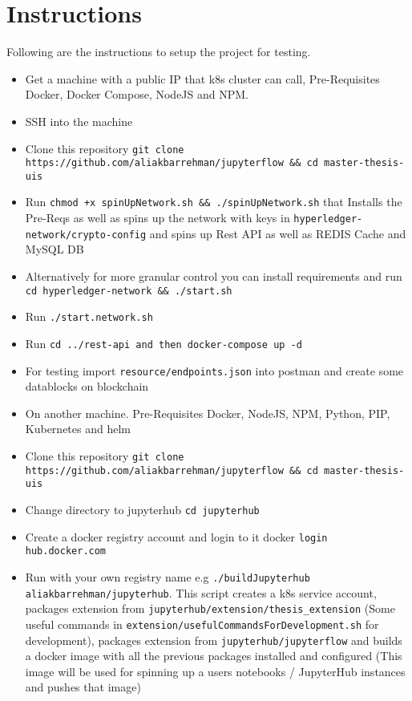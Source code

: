 \section{Instructions}
Following are the instructions to setup the project for testing.
\begin{itemize}
    \item Get a machine with a public IP that k8s cluster can call, Pre-Requisites Docker, Docker Compose, NodeJS and NPM.
    \item SSH into the machine
    \item Clone this repository \lstinline{git clone https://github.com/aliakbarrehman/jupyterflow && cd master-thesis-uis}
    \item Run \lstinline{chmod +x spinUpNetwork.sh && ./spinUpNetwork.sh} that Installs the Pre-Reqs as well as spins up the network with keys in \lstinline{hyperledger-network/crypto-config} and spins up Rest API as well as REDIS Cache and MySQL DB
    \item Alternatively for more granular control you can install requirements and run \lstinline{cd hyperledger-network && ./start.sh}
    \item Run \lstinline{./start.network.sh}
    \item Run \lstinline{cd ../rest-api and then docker-compose up -d}
    \item For testing import \lstinline{resource/endpoints.json} into postman and create some datablocks on blockchain
    \item On another machine. Pre-Requisites Docker, NodeJS, NPM, Python, PIP, Kubernetes and helm
    \item Clone this repository \lstinline{git clone https://github.com/aliakbarrehman/jupyterflow && cd master-thesis-uis}

    \item Change directory to jupyterhub \lstinline{cd jupyterhub}

    \item Create a docker registry account and login to it docker \lstinline{login hub.docker.com}

    \item Run with your own registry name e.g \lstinline{./buildJupyterhub aliakbarrehman/jupyterhub}. This script creates a k8s service account, packages extension from \lstinline{jupyterhub/extension/thesis_extension} (Some useful commands in \lstinline{extension/usefulCommandsForDevelopment.sh} for development), packages extension from \lstinline{jupyterhub/jupyterflow} and builds a docker image with all the previous packages installed and configured (This image will be used for spinning up a users notebooks / JupyterHub instances and pushes that image)


\end{itemize}

